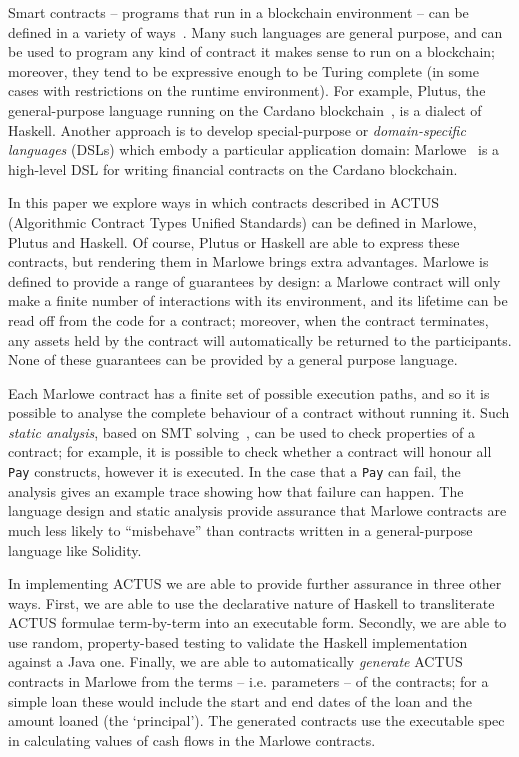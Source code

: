 \documentclass[runningheads]{llncs}
\begin{document}
Smart contracts -- programs that run in a blockchain environment --  can be defined in a variety of ways~\cite{cryptoeprint:2016:1156}. Many such languages are general purpose, and can be used to program any kind of contract it makes sense to run on a blockchain; moreover, they tend to be expressive enough to be Turing complete (in some cases with restrictions on the runtime environment). For example, Plutus, the general-purpose language running on the Cardano blockchain~\cite{utxo-vs-accounts}, is a dialect of Haskell. Another approach is to develop special-purpose or \emph{domain-specific languages} (DSLs) which embody a particular application domain: Marlowe~\cite{marlowe} is a high-level DSL for writing
financial contracts on the Cardano blockchain. 

In this paper we explore ways in which contracts described in ACTUS (Algorithmic Contract Types Unified Standards) can be defined in Marlowe, Plutus and Haskell. Of course, Plutus or Haskell are able to express these contracts, but rendering them in Marlowe brings extra advantages. Marlowe is defined to provide a range of guarantees by design: a Marlowe contract will only make a finite number of interactions with its environment, and its lifetime can be read off from the code for a contract; moreover, when the contract terminates, any assets held by the contract will automatically be returned to the participants. None of these guarantees can be provided by a general purpose language. 

Each Marlowe contract has a finite set of possible execution paths, and so it is possible to analyse the complete behaviour of a contract without running it. Such \emph{static analysis}, based on SMT solving~\cite{smt}, can be used to check properties of a contract; for example, it is possible to check whether a contract will honour all \texttt{Pay} constructs, however it is executed. In the case that a \texttt{Pay} can fail, the analysis gives an example trace showing how that failure can happen.
The language design and static analysis provide assurance that Marlowe contracts are much less likely to ``misbehave'' than contracts written in a general-purpose language like Solidity. 

In implementing ACTUS we are able to provide further assurance in three other ways. First, we are able to use the declarative nature of Haskell to transliterate ACTUS formulae term-by-term into an executable form. Secondly, we are able to use random, property-based testing to validate the Haskell implementation against a Java one. Finally, we are able to automatically \emph{generate} ACTUS contracts in Marlowe from the terms -- i.e. parameters -- of the contracts; for a simple loan these would include the start and end dates of the loan and the amount loaned (the `principal'). The generated contracts use the executable spec in calculating values of cash flows in the Marlowe contracts.
\end{document}
